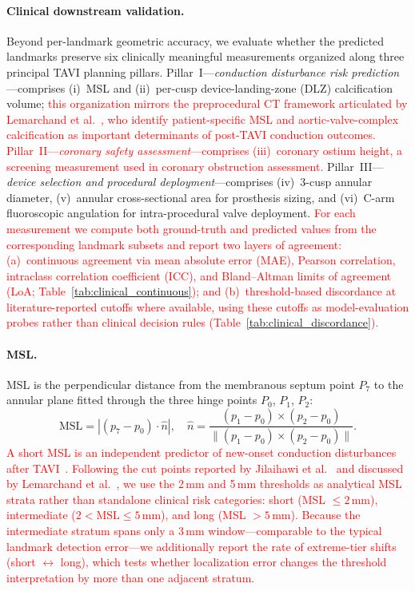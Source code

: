 \documentclass[conference]{IEEEtran}
\begin{document}
\paragraph{Clinical downstream validation.}
Beyond per-landmark geometric accuracy, we evaluate whether the predicted landmarks preserve six clinically meaningful measurements organized along three principal TAVI planning pillars. Pillar~I---\emph{conduction disturbance risk prediction}---comprises (i)~MSL and (ii)~per-cusp device-landing-zone (DLZ) calcification volume; \textcolor{red}{this organization mirrors the preprocedural CT framework articulated by Lemarchand et al.~\cite{Lemarchand2023_nocd,Lemarchand2026_cusp_overlap}, who identify patient-specific MSL and aortic-valve-complex calcification as important determinants of post-TAVI conduction outcomes.} \textcolor{red}{Pillar~II---\emph{coronary safety assessment}---comprises (iii)~coronary ostium height, a screening measurement used in coronary obstruction assessment.} Pillar~III---\emph{device selection and procedural deployment}---comprises (iv)~3-cusp annular diameter, (v)~annular cross-sectional area for prosthesis sizing, and (vi)~C-arm fluoroscopic angulation for intra-procedural valve deployment. \textcolor{red}{For each measurement we compute both ground-truth and predicted values from the corresponding landmark subsets and report two layers of agreement: (a)~continuous agreement via mean absolute error (MAE), Pearson correlation, intraclass correlation coefficient (ICC), and Bland--Altman limits of agreement (LoA; Table~\ref{tab:clinical_continuous}); and (b)~threshold-based discordance at literature-reported cutoffs where available, using these cutoffs as model-evaluation probes rather than clinical decision rules (Table~\ref{tab:clinical_discordance}).}

\paragraph{MSL.}
MSL is the perpendicular distance from the membranous septum point $P_7$ to the annular plane fitted through the three hinge points $P_0$, $P_1$, $P_2$:
\begin{equation}
  \text{MSL} = \left|(p_7 - p_0) \cdot \hat{n}\right|,\quad
  \hat{n} = \frac{(p_1-p_0) \times (p_2-p_0)}{\|(p_1-p_0) \times (p_2-p_0)\|}.
  \label{eq:msl}
\end{equation}
\textcolor{red}{A short MSL is an independent predictor of new-onset conduction disturbances after TAVI~\cite{Hamdan2015_msl_avblock,Maeno2017_pacemaker_tavr}. Following the cut points reported by Jilaihawi et al.~\cite{Jilaihawi2019_msl} and discussed by Lemarchand et al.~\cite{Lemarchand2023_nocd}, we use the 2\,mm and 5\,mm thresholds as analytical MSL strata rather than standalone clinical risk categories: short (MSL $\leq 2$\,mm), intermediate ($2 < \text{MSL} \leq 5$\,mm), and long (MSL $> 5$\,mm). Because the intermediate stratum spans only a 3\,mm window---comparable to the typical landmark detection error---we additionally report the rate of extreme-tier shifts (short $\leftrightarrow$ long), which tests whether localization error changes the threshold interpretation by more than one adjacent stratum.}
\end{document}
